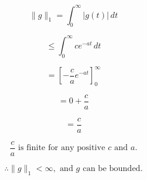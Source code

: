 \documentclass[12pt, letterpaper]{article}
\begin{document}
\[
\|g\|_1 = \int_0^\infty |g(t)| \, dt
\]

\[
\leq \int_0^\infty c e^{-a t} \, dt
\]

\[
= \left[ -\frac{c}{a} e^{-a t} \right]_0^\infty
\]

\[
= 0 + \frac{c}{a}
\]

\[
= \frac{c}{a}
\]

\[
\frac{c}{a} \text{ is finite for any positive } c \text{ and } a.
\]

\[
\therefore \|g\|_1 < \infty, \text{ and } g \text{ can be bounded.}
\]
\end{document}

